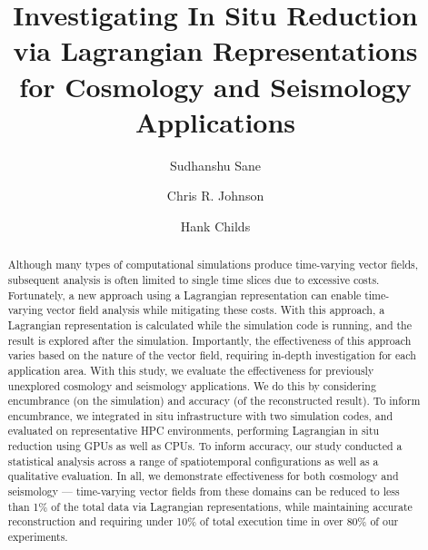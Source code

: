 \documentclass[runningheads]{llncs}
\begin{document}
%
\title{Investigating In Situ Reduction \\via Lagrangian Representations\\ for Cosmology and Seismology Applications}
%
%
%
%
%
\author{Sudhanshu Sane \and Chris R. Johnson \and Hank Childs}
\maketitle              %
%
\begin{abstract}
Although many types of computational simulations produce time-varying vector fields,
subsequent analysis is often limited to single time slices due to excessive costs.
%
Fortunately, a new approach using a Lagrangian representation can
enable time-varying vector field analysis while mitigating these costs.
%
With this approach, a Lagrangian representation is calculated while the simulation code is running, and the result is explored after the simulation.
%
Importantly,
 the effectiveness of this approach varies based on the nature of the vector field,
requiring in-depth investigation for each application area.
%
With this study, we evaluate the effectiveness for previously unexplored cosmology and seismology
applications. %
%
We do this by considering encumbrance (on the simulation) and accuracy (of the reconstructed result).
%
To inform encumbrance, we
integrated in situ infrastructure with two simulation codes,
and evaluated on representative HPC environments,
performing Lagrangian in situ reduction using GPUs as well as CPUs.
%
To inform accuracy, our study conducted a statistical analysis across a range of spatiotemporal configurations as well as a qualitative evaluation.
%
In all, we demonstrate effectiveness for both cosmology and seismology --- time-varying vector fields from these domains can be reduced to less than 1\% of the total data via Lagrangian representations, while maintaining accurate reconstruction and requiring under 10\% of total execution time in over 80\% of our experiments.
\end{abstract}
%
\end{document}
